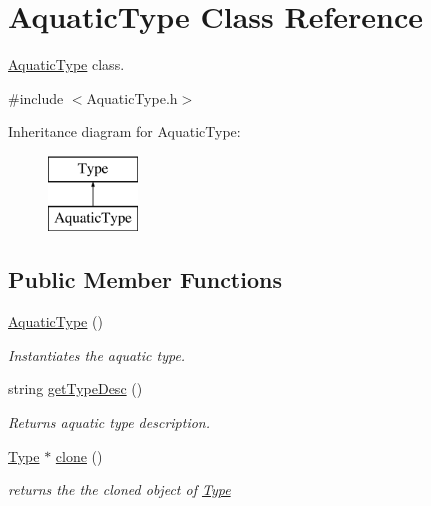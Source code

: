 \hypertarget{classAquaticType}{}\section{Aquatic\+Type Class Reference}
\label{classAquaticType}


\hyperlink{classAquaticType}{Aquatic\+Type} class.  




{\ttfamily \#include $<$Aquatic\+Type.\+h$>$}

Inheritance diagram for Aquatic\+Type\+:\begin{figure}[H]
\begin{center}
\leavevmode
\includegraphics[height=2.000000cm]{classAquaticType}
\end{center}
\end{figure}
\subsection*{Public Member Functions}
\begin{DoxyCompactItemize}
\item 
\mbox{\label{classAquaticType_a2e9287ecb48a58ca5d8fd560da4d9d57}} 
\hyperlink{classAquaticType_a2e9287ecb48a58ca5d8fd560da4d9d57}{Aquatic\+Type} ()
\begin{DoxyCompactList}\small\item\em Instantiates the aquatic type. \end{DoxyCompactList}\item 
string \hyperlink{classAquaticType_abb1b9ebdb96a352e0287f7a7cb803eab}{get\+Type\+Desc} ()
\begin{DoxyCompactList}\small\item\em Returns aquatic type description. \end{DoxyCompactList}\item 
\hyperlink{classType}{Type} $\ast$ \hyperlink{classAquaticType_afbcc6f679b6108c7ed286ab0aa91bdd5}{clone} ()
\begin{DoxyCompactList}\small\item\em returns the the cloned object of \hyperlink{classType}{Type} \end{DoxyCompactList}\end{DoxyCompactItemize}


